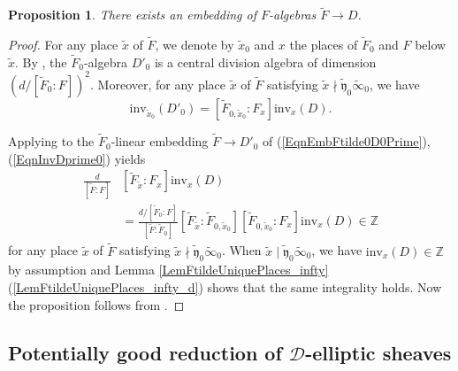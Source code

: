 \documentclass[10pt]{amsart}
\theoremstyle{plain}
\newtheorem{prop}[thm]{Proposition}
\theoremstyle{definition}
\newcommand{\inv}{\mathrm{inv}}
\newcommand{\bZ}{\mathbb{Z}}
\newcommand{\sD}{\mathscr{D}}
\newcommand{\fry}{\mathfrak{y}}
\begin{document}
\begin{prop}\label{PropFtildeD}
	There exists an embedding of $F$-algebras $\tilde{F}\to D$.
\end{prop}
\begin{proof}
	For any place $\tilde{x}$ of $\tilde{F}$, we denote by $\tilde{x}_0$ and $x$ the places of $\tilde{F}_0$ and $F$ below $\tilde{x}$.
	By \cite[Corollary 9.10]{LRS}, the $\tilde{F}_0$-algebra $D'_0$ is a central division algebra of dimension $(d/[\tilde{F}_0:F])^2$.
	Moreover, for any place $\tilde{x}$ of $\tilde{F}$ satisfying $\tilde{x}\nmid \tilde{\fry}_0\tilde{\infty}_0$, we have
	\begin{equation}\label{EqnInvDprime0}
	\inv_{\tilde{x}_0}(D'_0)=[\tilde{F}_{0,\tilde{x}_0}:F_x] \inv_x(D).
	\end{equation}
	
	
	Applying \cite[Corollary A.3.4]{Lau} to the $\tilde{F}_0$-linear embedding $\tilde{F}\to D'_0$
	of (\ref{EqnEmbFtilde0D0Prime}),
	(\ref{EqnInvDprime0}) yields
	\[
	\begin{aligned}
	\frac{d}{[\tilde{F}:F]}&[\tilde{F}_{\tilde{x}}:F_x]\inv_x(D)\\
	&=\frac{d/[\tilde{F}_0:F]}{[\tilde{F}:\tilde{F}_0]}
	[\tilde{F}_{\tilde{x}}:\tilde{F}_{0,\tilde{x}_0}][\tilde{F}_{0,\tilde{x}_0}:F_x] \inv_x(D)\in \bZ
	\end{aligned}
	\]
	for any place $\tilde{x}$ of $\tilde{F}$ satisfying $\tilde{x}\nmid \tilde{\fry}_0\tilde{\infty}_0$. 
	When $\tilde{x}\mid \tilde{\fry}_0\tilde{\infty}_0$, 
	we have $\inv_x(D)\in \bZ$ by assumption and Lemma \ref{LemFtildeUniquePlaces_infty} (\ref{LemFtildeUniquePlaces_infty_d})
	shows that the same integrality holds. Now the proposition follows from \cite[Corollary A.3.4]{Lau}.
\end{proof}





\subsection{Potentially good reduction of $\sD$-elliptic sheaves}\label{SubsecPotGoodRed}
\end{document}
